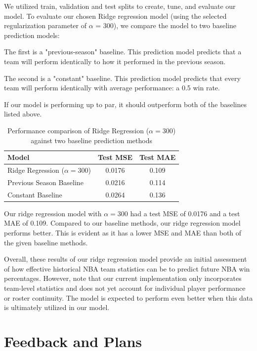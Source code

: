 \documentclass[11pt]{article}
\begin{document}
We utilized train, validation and test splits to create, tune, and evaluate our model. To evaluate our chosen Ridge regression model (using the selected regularization parameter of $\alpha$ = 300), we compare the model to two baseline prediction models:
\medskip


The first is a "previous-season" baseline. This prediction model predicts that a team will perform identically to how it performed in the previous season.

The second is a "constant" baseline. This prediction model predicts that every team will perform identically with average performance: a 0.5 win rate.
\medskip

If our model is performing up to par, it should outperform both of the baselines listed above.

\begin{table}[H]
    \centering
    \small
    \begin{tabular}{lcc}
        \hline
        \textbf{Model} & \textbf{Test MSE} & \textbf{Test MAE} \\
        \hline
        Ridge Regression ($\alpha=300$) & 0.0176 & 0.109 \\
        Previous Season Baseline & 0.0216 & 0.114 \\
        Constant Baseline & 0.0264 & 0.136 \\
        \hline
    \end{tabular}
    \caption{Performance comparison of Ridge Regression ($\alpha = 300$) against two baseline prediction methods}
    \label{tab:model_results}
\end{table}

Our ridge regression model with $\alpha = 300$ had a test MSE of 0.0176 and a test MAE of 0.109. Compared to our baseline methods, our ridge regression model performs better. This is evident as it has a lower MSE and MAE than both of the given baseline methods.
\medskip

Overall, these results of our ridge regression model provide an initial assessment of how effective historical NBA team statistics can be to predict future NBA win percentages. However, note that our current implementation only incorporates team-level statistics and does not yet account for individual player performance or roster continuity. The model is expected to perform even better when this data is ultimately utilized in our model.

\section{Feedback and Plans}
\end{document}
